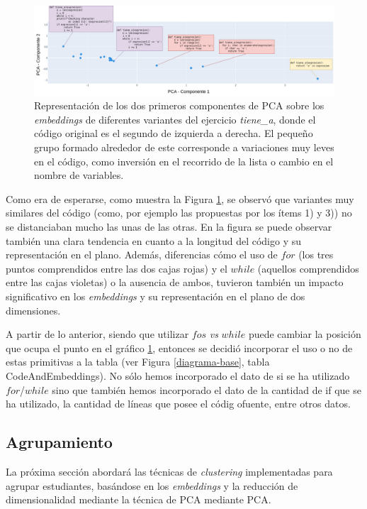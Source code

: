\documentclass[11pt,a4paper,twoside,openany]{tesis}
\begin{document}
\begin{figure}[H]
    \centering
    \includegraphics[width=\textwidth]{imagenes/codigo-similar.png}
    \caption{Representación de los dos primeros componentes de PCA sobre los \emph{embeddings} de diferentes variantes del ejercicio \emph{tiene\_a}, donde el código original es el segundo de izquierda a derecha. El pequeño grupo formado alrededor de este corresponde a variaciones muy leves en el código, como inversión en el recorrido de la lista o cambio en el nombre de variables.}
     \label{variaciones-codigo}
\end{figure}

Como era de esperarse, como muestra la Figura \ref{variaciones-codigo}, se observó que variantes muy similares del código (como, por ejemplo las propuestas por los ítems 1) y 3)) no se distanciaban mucho las unas de las otras. En la figura se puede observar también una clara tendencia en cuanto a la longitud del código y su representación en el plano. Además, diferencias cómo el uso de $for$ (los tres puntos comprendidos entre las dos cajas rojas) y el $while$ (aquellos comprendidos entre las cajas violetas) o la ausencia de ambos, tuvieron también un impacto significativo en los \emph{embeddings} y su representación en el plano de dos dimensiones.

A partir de lo anterior, siendo que utilizar $fos$ \emph{vs} $while$ puede cambiar la posición que ocupa el punto en el gráfico \ref{variaciones-codigo}, entonces se decidió incorporar el uso o no de estas primitivas a la tabla (ver Figura \ref{diagrama-base}, tabla CodeAndEmbeddings). No sólo hemos incorporado el dato de si se ha utilizado $for$/$while$ sino que también hemos incorporado el dato de la cantidad de if que se ha utilizado, la cantidad de líneas que posee el códig ofuente, entre otros datos.

\subsection{Agrupamiento}

La próxima sección abordará las técnicas de \emph{clustering} implementadas para agrupar estudiantes, basándose en los \emph{embeddings} y la reducción de dimensionalidad mediante la técnica de PCA mediante PCA.
\end{document}
